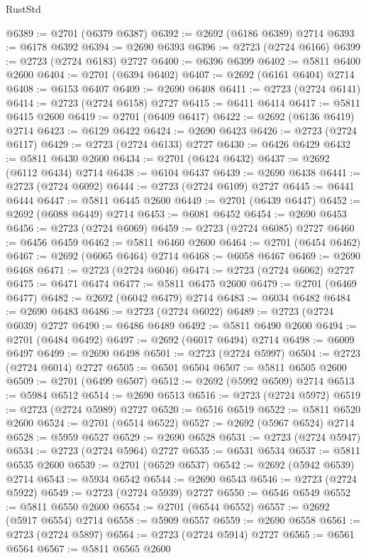 \begin{lexlean}{RustStd}
\begin{coremodule}
@6389 := @2701 (@6379 @6387)
@6392 := @2692 (@6186 @6389) @2714
@6393 := @6178 @6392
@6394 := @2690 @6393
@6396 := @2723 (@2724 @6166)
@6399 := @2723 (@2724 @6183) @2727
@6400 := @6396 @6399
@6402 := @5811 @6400 @2600
@6404 := @2701 (@6394 @6402)
@6407 := @2692 (@6161 @6404) @2714
@6408 := @6153 @6407
@6409 := @2690 @6408
@6411 := @2723 (@2724 @6141)
@6414 := @2723 (@2724 @6158) @2727
@6415 := @6411 @6414
@6417 := @5811 @6415 @2600
@6419 := @2701 (@6409 @6417)
@6422 := @2692 (@6136 @6419) @2714
@6423 := @6129 @6422
@6424 := @2690 @6423
@6426 := @2723 (@2724 @6117)
@6429 := @2723 (@2724 @6133) @2727
@6430 := @6426 @6429
@6432 := @5811 @6430 @2600
@6434 := @2701 (@6424 @6432)
@6437 := @2692 (@6112 @6434) @2714
@6438 := @6104 @6437
@6439 := @2690 @6438
@6441 := @2723 (@2724 @6092)
@6444 := @2723 (@2724 @6109) @2727
@6445 := @6441 @6444
@6447 := @5811 @6445 @2600
@6449 := @2701 (@6439 @6447)
@6452 := @2692 (@6088 @6449) @2714
@6453 := @6081 @6452
@6454 := @2690 @6453
@6456 := @2723 (@2724 @6069)
@6459 := @2723 (@2724 @6085) @2727
@6460 := @6456 @6459
@6462 := @5811 @6460 @2600
@6464 := @2701 (@6454 @6462)
@6467 := @2692 (@6065 @6464) @2714
@6468 := @6058 @6467
@6469 := @2690 @6468
@6471 := @2723 (@2724 @6046)
@6474 := @2723 (@2724 @6062) @2727
@6475 := @6471 @6474
@6477 := @5811 @6475 @2600
@6479 := @2701 (@6469 @6477)
@6482 := @2692 (@6042 @6479) @2714
@6483 := @6034 @6482
@6484 := @2690 @6483
@6486 := @2723 (@2724 @6022)
@6489 := @2723 (@2724 @6039) @2727
@6490 := @6486 @6489
@6492 := @5811 @6490 @2600
@6494 := @2701 (@6484 @6492)
@6497 := @2692 (@6017 @6494) @2714
@6498 := @6009 @6497
@6499 := @2690 @6498
@6501 := @2723 (@2724 @5997)
@6504 := @2723 (@2724 @6014) @2727
@6505 := @6501 @6504
@6507 := @5811 @6505 @2600
@6509 := @2701 (@6499 @6507)
@6512 := @2692 (@5992 @6509) @2714
@6513 := @5984 @6512
@6514 := @2690 @6513
@6516 := @2723 (@2724 @5972)
@6519 := @2723 (@2724 @5989) @2727
@6520 := @6516 @6519
@6522 := @5811 @6520 @2600
@6524 := @2701 (@6514 @6522)
@6527 := @2692 (@5967 @6524) @2714
@6528 := @5959 @6527
@6529 := @2690 @6528
@6531 := @2723 (@2724 @5947)
@6534 := @2723 (@2724 @5964) @2727
@6535 := @6531 @6534
@6537 := @5811 @6535 @2600
@6539 := @2701 (@6529 @6537)
@6542 := @2692 (@5942 @6539) @2714
@6543 := @5934 @6542
@6544 := @2690 @6543
@6546 := @2723 (@2724 @5922)
@6549 := @2723 (@2724 @5939) @2727
@6550 := @6546 @6549
@6552 := @5811 @6550 @2600
@6554 := @2701 (@6544 @6552)
@6557 := @2692 (@5917 @6554) @2714
@6558 := @5909 @6557
@6559 := @2690 @6558
@6561 := @2723 (@2724 @5897)
@6564 := @2723 (@2724 @5914) @2727
@6565 := @6561 @6564
@6567 := @5811 @6565 @2600

\end{coremodule}
\end{lexlean}
